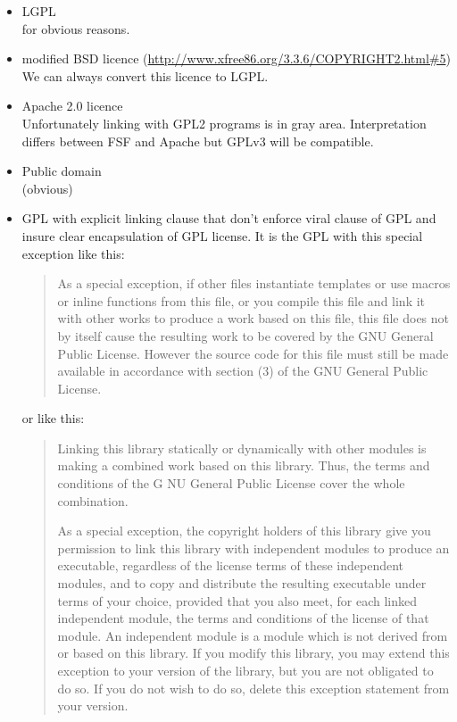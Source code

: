 \begin{itemize}
\item LGPL\\
  for obvious reasons.
\item  modified BSD licence
  (\url{http://www.xfree86.org/3.3.6/COPYRIGHT2.html#5})\\
  We can always convert this licence to LGPL.
\item  Apache 2.0 licence \\
  Unfortunately linking with GPL2 programs is in gray area.
  Interpretation differs between FSF and Apache but GPLv3 will be
  compatible.
\item Public domain\\
  (obvious)
\item GPL with explicit linking clause that don't enforce viral clause
  of GPL and insure clear encapsulation of GPL license. It is the GPL
  with this special exception like this:

  \begin{quote}
    As a special exception, if other files instantiate templates or
    use macros or inline functions from this file, or you compile this
    file and link it with other works to produce a work based on this
    file, this file does not by itself cause the resulting work to be
    covered by the GNU General Public License.  However the source
    code for this file must still be made available in accordance with
    section (3) of the GNU General Public License.
  \end{quote}
	   
  or like this:
	   
  \begin{quote}
    Linking this library statically or dynamically with other modules
    is making a combined work based on this library. Thus, the terms
    and conditions of the G NU General Public License cover the whole
    combination.
  
    As a special exception, the copyright holders of this library give
    you permission to link this library with independent modules to
    produce an executable, regardless of the license terms of these
    independent modules, and to copy and distribute the resulting
    executable under terms of your choice, provided that you also
    meet, for each linked independent module, the terms and conditions
    of the license of that module. An independent module is a module
    which is not derived from or based on this library. If you modify
    this library, you may extend this exception to your version of the
    library, but you are not obligated to do so.  If you do not wish
    to do so, delete this exception statement from your version.
  \end{quote}

\end{itemize}

